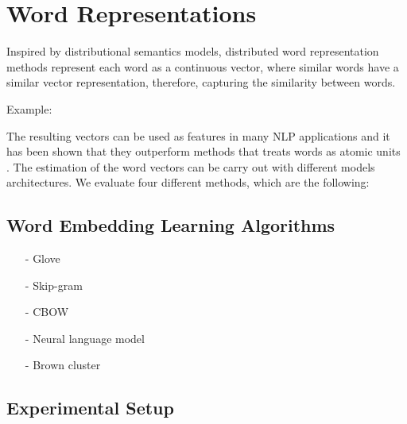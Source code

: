 \documentclass[11pt]{article}
\begin{document}






\section{Word Representations}


Inspired by distributional semantics models, distributed word
representation methods represent each word as a continuous vector, where
similar words have a similar vector representation, therefore, capturing
the similarity between words.

Example: 

The resulting vectors can be used as features in many NLP applications and it has been shown that they outperform methods that treats words as atomic units \cite{}. 
The estimation of the word vectors can be carry out with different models architectures. 
We evaluate four different methods, which are the following: 
 
\subsection{Word Embedding Learning Algorithms}
\begin{itemize}
\item[-] Glove \cite{pennington2014glove}
\item[-] Skip-gram \cite{Mikolov13}
\item[-] CBOW \cite{Mikolov13}
\item[-] Neural language model \cite{Turian10wordrepresentations}
\item[-] Brown cluster \cite{Brown92class-basedn-gram}
\end{itemize}



\subsection{Experimental Setup}
\end{document}
